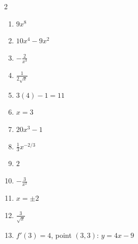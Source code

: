 \documentclass[11pt]{article}
\begin{document}
\begin{keybox}
\begin{multicols}{2}
\small
\begin{enumerate}[leftmargin=*,itemsep=3pt]
  \item $9x^8$
  \item $10x^4-9x^2$
  \item $-\tfrac2{x^3}$
  \item $\tfrac1{2\sqrt{x}}$
  \item $3(4)-1=11$
  \item $x=3$
  \item $20x^3-1$
  \item $\tfrac13x^{-2/3}$
  \item $2$
  \item $-\tfrac3{x^2}$
  \item $x=\pm2$
  \item $\tfrac3{\sqrt{x}}$
  \item $f'(3)=4$, point $(3,3)$: $y=4x-9$
\end{enumerate}
\end{multicols}
\end{keybox}
\end{document}
